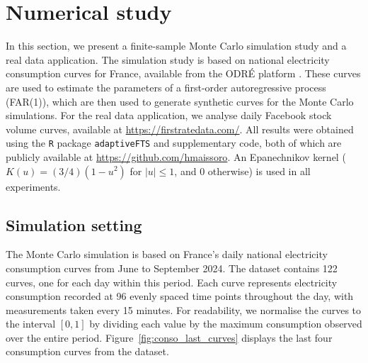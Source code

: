 \section{Numerical study}\label{sec:blup:numerical_study} 

In this section, we present a finite-sample Monte Carlo simulation study and a real data application. The simulation study is based on national electricity consumption curves for France, available from the ODR\'E platform \citep{odre_data}. These curves are used to estimate the parameters of a first-order autoregressive process (FAR(1)), which are then used to generate synthetic curves for the Monte Carlo simulations. For the real data application, we analyse daily Facebook stock volume curves, available at \url{https://firstratedata.com/}. All results were obtained using the \texttt{R} package \texttt{adaptiveFTS} and supplementary code, both of which are publicly available at \url{https://github.com/hmaissoro}. An Epanechnikov kernel ($K(u) = (3/4)(1 - u^2)$ for $|u| \leq 1$, and $0$ otherwise) is used in all experiments.


 

\subsection{Simulation setting}\label{blup:sec:simu_exp}
The Monte Carlo simulation is based on France's daily national electricity consumption curves from June to September 2024. The dataset contains 122 curves, one for each day within this period. Each curve represents electricity consumption recorded at 96 evenly spaced time points throughout the day, with measurements taken every 15 minutes. For readability, we normalise the curves to the interval $[0,1]$ by dividing each value by the maximum consumption observed over the entire period. Figure~\ref{fig:conso_last_curves} displays the last four consumption curves from the dataset. 

